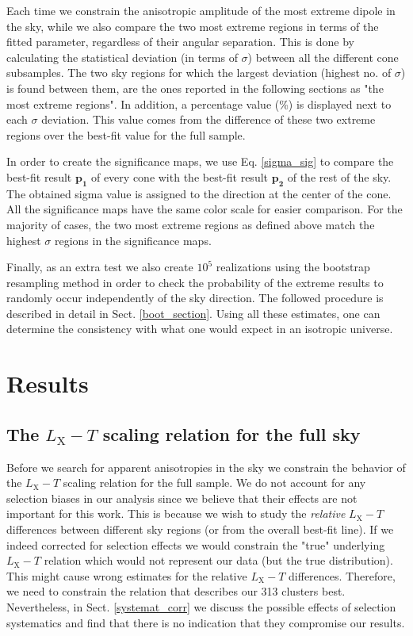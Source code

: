 \documentclass{aa}   %
\begin{document}
Each time we constrain the anisotropic amplitude of the most extreme dipole in the sky, while we also compare the two most extreme regions in terms of the fitted parameter, regardless of their angular separation. This is done by calculating the statistical deviation (in terms of $\sigma$) between all the different cone subsamples. The two sky regions for which the largest deviation (highest no. of $\sigma$) is found between them, are the ones reported in the following sections as "the most extreme regions".
In addition, a percentage value (\%) is displayed next to each $\sigma$ deviation. This value comes from the difference of these two extreme regions over the best-fit value for the full sample.

In order to create the significance maps, we use Eq. \ref{sigma_sig} to compare the best-fit result $\mathbf{p_1}$ of every cone with the best-fit result $\mathbf{p_2}$ of the rest of the sky. The obtained sigma value is assigned to the direction at the center of the cone. All the significance maps have the same color scale for easier comparison. For the majority of cases, the two most extreme regions as defined above match the highest $\sigma$ regions in the significance maps.

Finally, as an extra test we also create $10^5$ realizations using the bootstrap resampling method in order to check the probability of the extreme results to randomly occur independently of the sky direction. The followed procedure is described in detail in Sect. \ref{boot_section}. Using all these estimates, one can determine the consistency with what one would expect in an isotropic universe.



\section{Results}\label{mainresults} 

\subsection{The $L_{\text{X}}-T$ scaling relation for the full sky}

Before we search for apparent anisotropies in the sky we constrain the behavior of the $L_{\text{X}}-T$ scaling relation for the full sample. We do not account for any selection biases in our analysis since we believe that their effects are not important for this work. This is because we wish to study the \emph{relative} $L_{\text{X}}-T$  differences between different sky regions (or from the overall best-fit line). If we indeed corrected for selection effects we would constrain the "true" underlying $L_{\text{X}}-T$ relation which would not represent our data (but the true distribution). This might cause wrong estimates for the relative $L_{\text{X}}-T$  differences. Therefore, we need to constrain the relation that describes our 313 clusters best. Nevertheless, in Sect. \ref{systemat_corr} we discuss the possible effects of selection systematics and find that there is no indication that they compromise our results.
\end{document}
